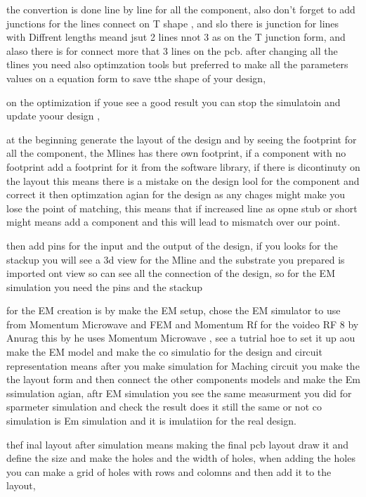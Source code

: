 \documentclass{article}
\begin{document}
\begin{itemize}
the convertion is  done line by line for all the component, also don't forget to add junctions for the lines connect on T shape , and slo there is junction for lines with Diffrent lengths meand jsut 2 lines nnot 3 as on the T junction form, and alaso there is for connect more that 3 lines on the pcb.
after changing all the tlines you need also optimzation tools but preferred to make all the parameters values on a equation form to save tthe shape of your design,

on the optimization if youe see a good result you can stop the simulatoin and update yoour  design , 




at the beginning generate the layout of the design and by seeing the footprint for all the component, the Mlines has there own footprint, if a component with no footprint add a footprint for it from the software library, 
if there is dicontinuty on the layout this means there is a mistake on the design lool for the component and correct it then optimzation agian for the design as any chages might make you lose the point of matching, this means that if increased line as opne stub or short might means add a component and this  will lead to mismatch over our point. 


then add pins for the input and the output of the design, if you looks for the stackup you will see a 3d view for the Mline and the substrate you prepared is imported ont view so can see all the connection of the design, so for the EM simulation you need the pins and the stackup 


for the EM creation is by make the EM setup, chose the EM simulator to use from Momentum Microwave and FEM and Momentum Rf 
for the  voideo RF 8 by Anurag this by he uses Momentum Microwave , 
see a tutrial hoe to set it up 
aou make the EM model and make the co simulatio for the design and circuit representation 
means after you make simulation for Maching circuit you make the the layout form and then connect the other components models and make the Em ssimulation agian,
aftr EM simulation you see the same measurment you did for sparmeter simulation
and check the result does it still the same or not  co simulation is Em simulation and it is imulatiion for the real design.

thef inal layout after simulation means making the final pcb layout draw it and define the size and make the holes and the width of holes, 
when adding the holes you can make a grid of holes with rows and colomns and then add it to the layout, 


\end{itemize}
\end{document}
